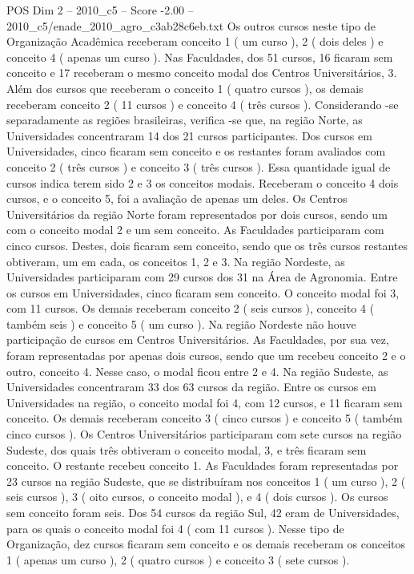 \begin{textsample}{POS Dim 2 – 2010\_c5 – Score -2.00 – 2010\_c5/enade\_2010\_agro\_c3ab28c6eb.txt}
Os outros cursos neste tipo de Organização Acadêmica receberam conceito 1 ( um curso ), 2 ( dois deles ) e conceito 4 ( apenas um curso ).
Nas Faculdades, dos 51 cursos, 16 ficaram sem conceito e 17 receberam o mesmo conceito modal dos Centros Universitários, 3.
Além dos cursos que receberam o conceito 1 ( quatro cursos ), os demais receberam conceito 2 ( 11 cursos ) e conceito 4 ( três cursos ).
Considerando -se separadamente as regiões brasileiras, verifica -se que, na região Norte, as Universidades concentraram 14 dos 21 cursos participantes.
Dos cursos em Universidades, cinco ficaram sem conceito e os restantes foram avaliados com conceito 2 ( três cursos ) e conceito 3 ( três cursos ).
Essa quantidade igual de cursos indica terem sido 2 e 3 os conceitos modais.
Receberam o conceito 4 dois cursos, e o conceito 5, foi a avaliação de apenas um deles.
Os Centros Universitários da região Norte foram representados por dois cursos, sendo um com o conceito modal 2 e um sem conceito.
As Faculdades participaram com cinco cursos.
Destes, dois ficaram sem conceito, sendo que os três cursos restantes obtiveram, um em cada, os conceitos 1, 2 e 3.
Na região Nordeste, as Universidades participaram com 29 cursos dos 31 na Área de Agronomia.
Entre os cursos em Universidades, cinco ficaram sem conceito.
O conceito modal foi 3, com 11 cursos.
Os demais receberam conceito 2 ( seis cursos ), conceito 4 ( também seis ) e conceito 5 ( um curso ).
Na região Nordeste não houve participação de cursos em Centros Universitários.
As Faculdades, por sua vez, foram representadas por apenas dois cursos, sendo que um recebeu conceito 2 e o outro, conceito 4.
Nesse caso, o modal ficou entre 2 e 4.
Na região Sudeste, as Universidades concentraram 33 dos 63 cursos da região.
Entre os cursos em Universidades na região, o conceito modal foi 4, com 12 cursos, e 11 ficaram sem conceito.
Os demais receberam conceito 3 ( cinco cursos ) e conceito 5 ( também cinco cursos ).
Os Centros Universitários participaram com sete cursos na região Sudeste, dos quais três obtiveram o conceito modal, 3, e três ficaram sem conceito.
O restante recebeu conceito 1.
As Faculdades foram representadas por 23 cursos na região Sudeste, que se distribuíram nos conceitos 1 ( um curso ), 2 ( seis cursos ), 3 ( oito cursos, o conceito modal ), e 4 ( dois cursos ).
Os cursos sem conceito foram seis.
Dos 54 cursos da região Sul, 42 eram de Universidades, para os quais o conceito modal foi 4 ( com 11 cursos ).
Nesse tipo de Organização, dez cursos ficaram sem conceito e os demais receberam os conceitos 1 ( apenas um curso ), 2 ( quatro cursos ) e conceito 3 ( sete cursos ).

\end{textsample}
